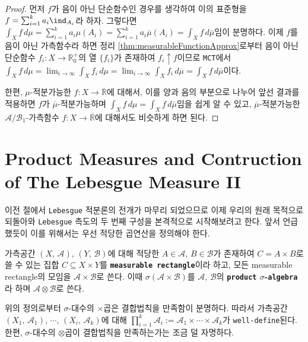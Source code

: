 \begin{proof}
    먼저 $f$가 음이 아닌 단순함수인 경우를 생각하여 이의 표준형을 $f=\sum_{i=1}^ka_i\ind_{A_i}$라 하자. 그렇다면 $\int_Xf\,d\mu=\sum_{i=1}^ka_i\mu(A_i)=\sum_{i=1}^ka_i\overline{\mu}(A_i)=\int_Xf\,d\overline{\mu}$임이 분명하다. 이제 $f$를 음이 아닌 가측함수라 하면 정리 \ref{thm:measurableFunctionApprox}로부터 음이 아닌 단순함수 $f_i:X\to\mathbb{R}^+_0$의 열 $\{f_i\}$가 존재하여 $f_i\uparrow f$이므로 \texttt{MCT}에서 $\int_Xf\,d\mu=\lim_{i\to\infty}\int_Xf_i\,d\mu=\lim_{i\to\infty}\int_Xf_i\,d\overline{\mu}=\int_Xf\,d\overline{\mu}$이다.

    한편, $\mu$-적분가능한 $f:X\to\overline{\mathbb{R}}$에 대해서, 이를 양과 음의 부분으로 나누어 앞선 결과를 적용하면 $f$가 $\overline{\mu}$-적분가능하며 $\int_Xf\,d\mu=\int_Xf\,d\overline{\mu}$임을 쉽게 알 수 있고, $\overline{\mu}$-적분가능한 $\mathcal{A}/\mathcal{B}_1$-가측함수 $f:X\to\overline{\mathbb{R}}$에 대해서도 비슷하게 하면 된다.
\end{proof}

\section{Product Measures and Contruction of The Lebesgue Measure II}

이전 절에서 \texttt{Lebesgue} 적분론의 전개가 마무리 되었으므로 이제 우리의 원래 목적으로 되돌아와 \texttt{Lebesgue} 측도의 두 번째 구성을 본격적으로 시작해보려고 한다. 앞서 언급했듯이 이를 위해서는 우선 적당한 곱연산을 정의해야 한다.

\begin{definition}
    가측공간 $(X,\,\mathcal{A}),\,(Y,\,\mathcal{B})$에 대해 적당한 $A\in\mathcal{A},\,B\in\mathcal{B}$가 존재하여 $C=A\times B$로 쓸 수 있는 집합 $C\subseteq X\times Y$를 \textbf{\texttt{measurable rectangle}}이라 하고, 모든 measurable rectangle의 모임을 $\mathcal{A}\times\mathcal{B}$로 쓴다. 이때 $\sigma(\mathcal{A}\times\mathcal{B})$를 $\mathcal{A},\,\mathcal{B}$의 \textbf{\texttt{product} $\sigma$-\texttt{algebra}}라 하며 $\mathcal{A}\otimes\mathcal{B}$로 쓴다.
\end{definition}

위의 정의로부터 $\sigma$-대수의 $\times$곱은 결합법칙을 만족함이 분명하다. 따라서 가측공간 $(X_1,\,\mathcal{A}_1),\,\cdots,\,(X_i,\,\mathcal{A}_k)$에 대해 $\prod_{i=1}^k\mathcal{A}_i:=\mathcal{A}_1\times\cdots\times\mathcal{A}_k$가 \texttt{well-define}된다. 한편, $\sigma$-대수의 $\otimes$곱이 결합법칙을 만족하는가는 조금 덜 자명하다.

